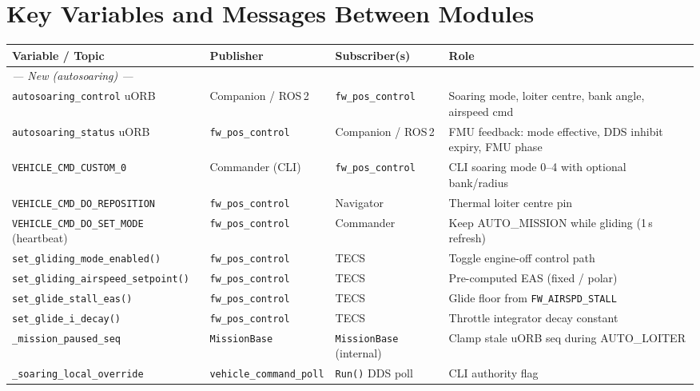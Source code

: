 \documentclass[11pt,a4paper]{article}
\begin{document}
\newpage

\section*{Key Variables and Messages Between Modules}

\begin{center}
\renewcommand{\arraystretch}{1.35}
\begin{tabular}{p{4.8cm}p{2.8cm}p{2.8cm}p{5.5cm}}
\toprule
Variable / Topic & Publisher & Subscriber(s) & Role \\
\midrule
\multicolumn{4}{l}{\textit{\textcolor{colNew}{--- New (autosoaring) ---}}} \\
\texttt{autosoaring\_control} uORB & Companion / ROS\,2 & \texttt{fw\_pos\_control} & Soaring mode, loiter centre, bank angle, airspeed cmd \\
\texttt{autosoaring\_status} uORB & \texttt{fw\_pos\_control} & Companion / ROS\,2 & FMU feedback: mode effective, DDS inhibit expiry, FMU phase \\
\texttt{VEHICLE\_CMD\_CUSTOM\_0} & Commander (CLI) & \texttt{fw\_pos\_control} & CLI soaring mode 0--4 with optional bank/radius \\
\texttt{VEHICLE\_CMD\_DO\_REPOSITION} & \texttt{fw\_pos\_control} & Navigator & Thermal loiter centre pin \\
\texttt{VEHICLE\_CMD\_DO\_SET\_MODE} (heartbeat) & \texttt{fw\_pos\_control} & Commander & Keep AUTO\_MISSION while gliding (1\,s refresh) \\
\texttt{set\_gliding\_mode\_enabled()} & \texttt{fw\_pos\_control} & TECS & Toggle engine-off control path \\
\texttt{set\_gliding\_airspeed\_setpoint()} & \texttt{fw\_pos\_control} & TECS & Pre-computed EAS (fixed / polar) \\
\texttt{set\_glide\_stall\_eas()} & \texttt{fw\_pos\_control} & TECS & Glide floor from \texttt{FW\_AIRSPD\_STALL} \\
\texttt{set\_glide\_i\_decay()} & \texttt{fw\_pos\_control} & TECS & Throttle integrator decay constant \\
\texttt{\_mission\_paused\_seq} & \texttt{MissionBase} & \texttt{MissionBase} (internal) & Clamp stale uORB seq during AUTO\_LOITER \\
\texttt{\_soaring\_local\_override} & \texttt{vehicle\_command\_poll} & \texttt{Run()} DDS poll & CLI authority flag \\

\end{tabular}
\end{center}
\end{document}
